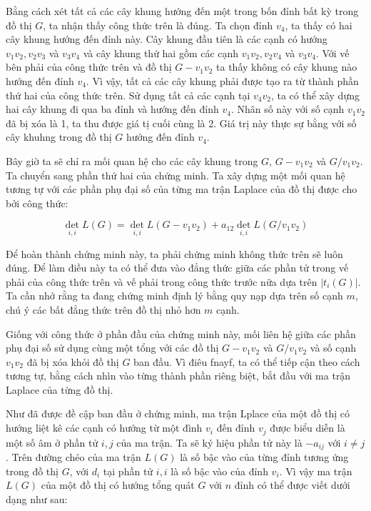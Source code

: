 \documentclass[14pt, a4paper]{article}
\numberwithin{equation}{section}
\numberwithin{figure}{section}
\numberwithin{dl}{section}
\numberwithin{md}{section}
\numberwithin{bd}{section}
\numberwithin{dn}{section}
\numberwithin{hq}{section}
\begin{document}
    Bằng cách xét tất cả các cây khung hướng đến một trong bốn đỉnh bất kỳ trong đồ thị $G$, ta nhận thấy công thức trên là đúng.
    Ta chọn đỉnh $v_4$, ta thấy có hai cây khung hướng đến đỉnh này.
    Cây khung đầu tiên là các cạnh có hướng $v_1 v_2, v_2 v_3$ và $v_3 v_4$ và cây khung thứ hai gồm các cạnh $v_1 v_2, v_2 v_4$ và $v_3 v_4$.
    Với vế bên phải của công thức trên và đồ thị $G - v_1 v_2$ ta thấy không có cây khung nào hướng đến đỉnh $v_4$.
    Vì vậy, tất cả các cây khung phải được tạo ra từ thành phần thứ hai của công thức trên.
    Sử dụng tất cả các cạnh tại $v_4 v_2$, ta có thể xây dựng hai cây khung đi qua ba đỉnh và hướng đến đỉnh $v_4$.
    Nhân số này với số cạnh $v_1 v_2$ đã bị xóa là 1, ta thu được giá tị cuối cùng là 2.
    Giá trị này thực sự bằng với số cây khuhng trong đồ thị $G$ hướng đến đỉnh $v_4$.

    Bây giờ ta sẽ chỉ ra mối quan hệ cho các cây khung trong $G$, $G - v_1 v_2$ và $G / v_1 v_2$.
    Ta chuyển sang phần thứ hai của chứng minh.
    Ta xây dựng một mối quan hệ tương tự với các phần phụ đại số của từng ma trận Laplace của đồ thị được cho bởi công thức:

    \begin{equation}
        \det_{i, i} L(G) = \det_{i, i} L(G - v_1 v_2) + a_{12} \det_{i, i} L (G / v_1 v_2)
    \end{equation}

    Để hoàn thành chứng minh này, ta phải chứng minh không thức trên sẽ luôn đúng.
    Để làm điều này ta có thể đưa vào đẳng thức giữa các phần tử trong vế phải của công thức trên và vế phải trong công thức trước nữa dựa trên $\lvert t_i (G) \rvert$.
    Ta cần nhớ rằng ta đang chứng minh định lý bằng quy nạp dựa trên số cạnh $m$, chú ý các bất đẳng thức trên đồ thị nhỏ hơn $m$ cạnh.

    Giống với công thức ở phần đầu của chứng minh này, mối liên hệ giữa các phần phụ đại số sử dụng cùng một tổng với các đồ thị $G - v_1 v_2$ và $G / v_1 v_2$ và số cạnh $v_1 v_2$ đã bị xóa khỏi đồ thị $G$ ban đầu.
    Vì điêu fnayf, ta có thể tiếp cận theo cách tương tự, bằng cách nhìn vào từng thành phần riêng biệt, bắt đầu với ma trận Laplace của từng đồ thị.

    Như đã được đề cập ban đầu ở chứng minh, ma trận Lplace  của một đồ thị có hướng liệt kê các cạnh có hướng từ một đình $v_i$ đến đỉnh $v_j$ được biểu diễn là một số âm ở phần tử $i, j$ của ma trận.
    Ta sẽ ký hiệu phần tử này là $-a_{ij}$ với $i \neq j$.
    Trên đường chéo của ma trận $L(G)$ là số bậc vào của từng đỉnh tương ứng trong đồ thị $G$, với $d_i$ tại phần tử $i, i$ là số bậc vào của đỉnh $v_i$.
    Vì vậy ma trận $L(G)$ của một đồ thị có hướng tổng quát $G$ với $n$ đỉnh có thể được viết dưới dạng như sau:
\end{document}
